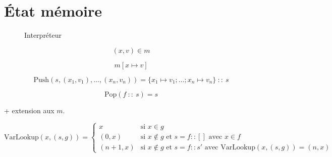 \section{État mémoire}

\begin{figure}





  \caption{Interpréteur}
  \label{fig:interp}
\end{figure}

\[
  (x, v) ∈ m
\]

\[
  m[x ↦ v]
\]


\[
  \mathrm{Push}(s, (x_1, v_1), …, (x_n, v_n)) = \{ x_1 ↦ v_1 ; … ; x_n ↦ v_n \}~::~s
\]

\[
  \mathrm{Pop}(f~::~s) = s
\]

+ extension aux $m$.

\[
  \textrm{VarLookup} (x, (s, g)) =
  \left\{
    \begin{array}{ll}
      x      & \mbox{si } x ∈ g \\
    (0, x)   & \mbox{si } x ∉ g \mbox{ et } s = f::[]
               \mbox{ avec } x ∈ f \\
    (n+1, x) & \mbox{si } x ∉ g \mbox{ et } s = f::s'
               \mbox{ avec } \textrm{VarLookup} (x, (s, g)) = (n, x)
    \end{array}
  \right.
\]

